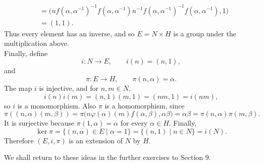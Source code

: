 \documentclass[../Odyssey_Project.tex]{subfiles}
\begin{document}
\begin{solution}
\begin{align*}
        &=
        \bigl(nf(\alpha,\alpha^{-1})^{-1}
        f(\alpha,\alpha^{-1})n^{-1}f(\alpha,\alpha^{-1})^{-1}
        f(\alpha,\alpha^{-1}),1\bigr) \\
        &=
        (1,1).
    \end{align*}
    Thus every element has an inverse, and so $E = N \times H$ is a group under the multiplication above. \\
    Finally, define
    \[
        i \colon N \to E,
        \qquad
        i(n) = (n,1),
    \]
    and
    \[
        \pi \colon E \to H,
        \qquad
        \pi(n,\alpha) = \alpha.
    \]
    The map $i$ is injective, and for $n,m \in N$,
    \[
        i(n)i(m)
        =
        (n,1)(m,1)
        =
        (nm,1)
        =
        i(nm),
    \]
    so $i$ is a monomorphism. Also $\pi$ is a homomorphism, since
    \[
        \pi((n,\alpha)(m,\beta))
        =
        \pi\bigl(n\varphi(\alpha)(m)f(\alpha,\beta),\alpha\beta\bigr)
        =
        \alpha\beta
        =
        \pi(n,\alpha)\pi(m,\beta).
    \]
    It is surjective because $\pi(1,\alpha) = \alpha$ for every $\alpha \in H$. Finally,
    \[
        \ker\pi
        =
        \{(n,\alpha) \in E \mid \alpha = 1\}
        =
        \{(n,1) \mid n \in N\}
        =
        i(N).
    \]
    Therefore $(E,i,\pi)$ is an extension of $N$ by $H$.
\end{solution}

\noindent We shall return to these ideas in the further exercises to Section 9.
\end{document}

